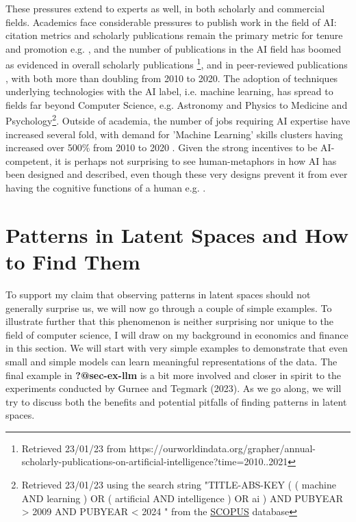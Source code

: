 \documentclass{article}
\theoremstyle{plain}
\theoremstyle{definition}
\theoremstyle{remark}
\begin{document}
These pressures extend to experts as well, in both scholarly and commercial fields. Academics face considerable pressures to publish work in the field of AI: citation metrics and scholarly publications remain the primary metric for tenure and promotion e.g. \cite{alperin2019significant}, and the number of publications in the AI field has boomed as evidenced in overall scholarly publications \footnote{ Retrieved 23/01/23 from https://ourworldindata.org/grapher/annual-scholarly-publications-on-artificial-intelligence?time=2010..2021 }, and in peer-reviewed publications \cite{Maslej2023-pi}, with both more than doubling from 2010 to 2020. The adoption of techniques underlying technologies with the AI label, i.e. machine learning, has spread to fields far beyond Computer Science, e.g. Astronomy and Physics to Medicine and Psychology\footnote{Retrieved 23/01/23 using the search string "TITLE-ABS-KEY ( ( machine  AND  learning )  OR  ( artificial  AND  intelligence )  OR  ai )  AND  PUBYEAR  >  2009  AND  PUBYEAR  <  2024 " from the \href{https://www.scopus.com/}{SCOPUS} database}. Outside of academia, the number of jobs requiring AI expertise have increased several fold, with demand for 'Machine Learning' skills clusters having increased over 500\% from 2010 to 2020 \cite{Maslej2023-pi}. Given the strong incentives to be AI-competent, it is perhaps not surprising to see human-metaphors in how AI has been designed and described, even though these very designs prevent it from ever having the cognitive functions of a human e.g. \cite{salles2020anthropomorphism, van2023reclaiming}. 

\section{Patterns in Latent Spaces and How to Find
Them}\label{patterns-in-latent-spaces-and-how-to-find-them}

To support my claim that observing patterns in latent spaces should not
generally surprise us, we will now go through a couple of simple
examples. To illustrate further that this phenomenon is neither
surprising nor unique to the field of computer science, I will draw on
my background in economics and finance in this section. We will start
with very simple examples to demonstrate that even small and simple
models can learn meaningful representations of the data. The final
example in \textbf{?@sec-ex-llm} is a bit more involved and closer in
spirit to the experiments conducted by Gurnee and Tegmark (2023). As we
go along, we will try to discuss both the benefits and potential
pitfalls of finding patterns in latent spaces.
\end{document}
